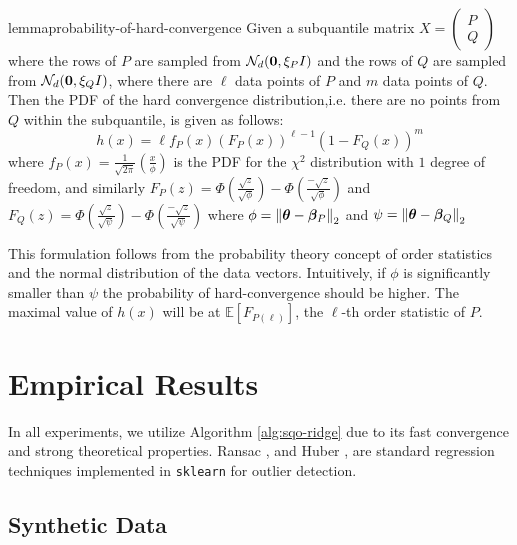 \documentclass{article} %
\newcommand{\norm}[1]{\left\lVert#1\right\rVert}
\begin{document}
	\begin{restatable}{lemma}{probability-of-hard-convergence}
		\label{thm:probability-of-hard-convergence}
		Given a subquantile matrix $X = \begin{pmatrix}P\\Q\end{pmatrix}$ where the rows of $P$ are sampled from $\mathcal{N}_d({\bm{0}}, \xi_P I)$ and the rows of $Q$ are sampled from $\mathcal{N}_d({\bm{0}}, \xi_Q I)$, where there are $\ell$ data points of $P$ and $m$ data points of $Q$. Then the PDF of the hard convergence distribution,i.e. there are no points from $Q$ within the subquantile, is given as follows:
		\begin{equation}h(x) = \ell f_P(x) \left(F_P(x)\right)^{\ell-1}\left(1 - F_Q(x)\right)^{m}\end{equation}
		where $f_P(x) = \frac{1}{\sqrt{2\pi}}\left(\frac{x}{\phi}\right)$ is the PDF for the $\chi^2$ distribution with $1$ degree of freedom, and similarly $F_P(z) = \Phi\left(\frac{\sqrt{z}}{\sqrt{\phi}}\right) - \Phi\left(\frac{-\sqrt{z}}{\sqrt{\phi}}\right)$ and $F_Q(z) = \Phi\left(\frac{\sqrt{z}}{\sqrt{\psi}}\right) - \Phi\left(\frac{-\sqrt{z}}{\sqrt{\psi}}\right)$ where $\phi = \norm{\vtheta - \vbeta_P}_2$ and $\psi = \norm{\vtheta - \vbeta_Q}_2$
	\end{restatable}
	This formulation follows from the probability theory concept of order statistics and the normal distribution of the data vectors. Intuitively, if $\phi$ is significantly smaller than $\psi$ the probability of hard-convergence should be higher. The maximal value of $h(x)$ will be at $\mathbb{E}\left[F_{P(\ell)}\right] $, the $\ell$-th order statistic of $P$.

	
	\section{Empirical Results}\label{sec:numerical-experiments}
	In all experiments, we utilize Algorithm \ref{alg:sqo-ridge} due to its fast convergence and strong theoretical properties. Ransac \cite{RANSAC1981}, and Huber \cite{Huber2009}, are standard regression techniques implemented in \texttt{sklearn} for outlier detection. 
	\subsection{Synthetic Data}
	
\end{document}
